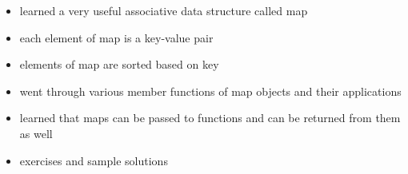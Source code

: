 \documentclass[11pt]{article}
\makeatletter
\providecommand{\tightlist}{%
      \setlength{\itemsep}{0pt}\setlength{\parskip}{0pt}}
\newcommand{\boxspacing}{\kern\kvtcb@left@rule\kern\kvtcb@boxsep}
\newcommand{\prompt}[4]{
        {\ttfamily\llap{{\color{#2}[#3]:\hspace{3pt}#4}}\vspace{-\baselineskip}}
    }
\makeatother
\begin{document}
\begin{itemize}
\tightlist
\item
  learned a very useful associative data structure called map
\item
  each element of map is a key-value pair
\item
  elements of map are sorted based on key
\item
  went through various member functions of map objects and their
  applications
\item
  learned that maps can be passed to functions and can be returned from
  them as well
\item
  exercises and sample solutions
\end{itemize}

    \begin{tcolorbox}[breakable, size=fbox, boxrule=1pt, pad at break*=1mm,colback=cellbackground, colframe=cellborder]
\prompt{In}{incolor}{ }{\boxspacing}
\begin{Verbatim}[commandchars=\\\{\}]

\end{Verbatim}
\end{tcolorbox}


    
    
    
\end{document}
